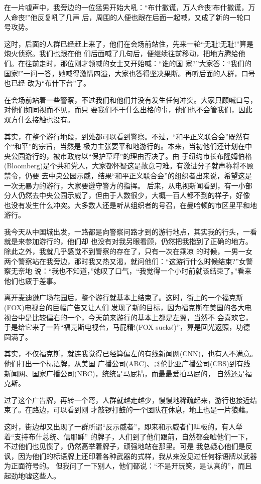 ﻿\documentclass[11pt]{article}
\begin{document}
在一片嘘声中，我旁边的一位猛男开始大吼：``布什撒谎，万人命丧!布什撒谎，万人命丧!''他反复吼了几声
后，周围的人便也跟在后面一起喊，又成了新的一轮口号攻势。

这时，后面的人群已经赶上来了，他们在会场前站住，先来一轮``无耻!无耻!''算是炮火侦察。我们也跟在他
们后面喊了几句后，便继续往前移动，把地方腾给他们。在往前走时，那位刚才领喊的女士又开始喊：``谁的国
家?''大家答：``我们的国家!''一问一答，她喊得激情四溢，大家也答得坚决果断。再听后面的人群，口号也已经
改为``布什下台''了。

在会场前站着一些警察，不过我们和他们并没有发生任何冲突。大家只顾喊口号，对他们如同视而不见，而只
要我们不干什么出格的事，他们也不会管我们，因此双方什么接触也没有。

其实，在整个游行地段，到处都可以看到警察。不过，``和平正义联合会''既然有个``和平''的宗旨，当然是
极力主张要平和地游行的。本来，当初他们还计划在中央公园游行的，被市政府以``保护草坪''的理由否决了。由
于纽约市长布隆姆伯格(Bloomberg)是个共和党人，大家都怀疑这是故意刁难。有激进分子就声称将不顾禁令，仍要
去中央公园示威，结果``和平正义联合会''的组织者出来说，希望这是一次无暴力的游行，大家要遵守警方的指挥。
后来，从电视新闻看到，有一小部分人仍然去中央公园示威了，但由于人数很少，大概一百人都不到的样子，好像
也没有发生什么冲突。大多数人还是听从组织者的号召，在曼哈顿的市区里平和地游行。


我今天从中国城出发，一路都是向警察问路才到的游行地点，其实我的行头，一看就是来参加游行的，他们却
也没有对我另眼看顾，仍然把我指到了正确的地方。除此之外，我就几乎感觉不到警察的存在了，只有一次在乘凉
的时候，一男一女两个警察站在我旁边，那时我又热又渴，就问他们：``这游行什么时候结束?''女警察无奈地
说：``我也不知道，''她叹了口气，``我觉得一个小时前就该结束了。''看来他们也疲于差事。

离开麦迪逊广场花园后，整个游行就基本上结束了。这时，街上的一个福克斯(FOX)电视台的巨幅广告又让人们
发现了新的目标，因为福克斯在美国的各大电视台中是比较偏右的一个，今天前来游行的基本上都是左翼，当然不
会喜欢它，于是给它来了一阵``福克斯电视台，马屁精!(FOX sucks!)''，算是回光返照，功德圆满了。

其实，不仅福克斯，就连我觉得已经算偏左的有线新闻网(CNN)，也有人不满意。他们打出一个标语牌，从美国
广播公司(ABC)、哥伦比亚广播公司(CBS)到有线新闻网、国家广播公司(NBC)，统统是马屁精，而最最爱拍马屁的，
自然还是福克斯。

过了这个广告牌，再转一个弯，人群就越走越少，慢慢地稀疏起来，游行也接近结束了。在路边，可以看到刚
才敲锣打鼓的一个团队在休息，地上也是一片狼藉。

这时，街边却又出现了一群所谓``反示威者''，即来和示威者们叫板的。有人举着``支持布什总统、信耶稣''
的牌子，人们到了他们跟前，自然都会嘘他们一下，不过他们也见惯了，仍然高举着牌子，顽强地站在那里。可是
我总疑心他们是反讽，因为他们的标语牌上还印着各种武器的式样，我从来没见过任何标语牌以武器为正面符号的。
但我问了一下别人，他们都说：``不是开玩笑，是认真的''，而且起劲地嘘这些人。
\end{document}
